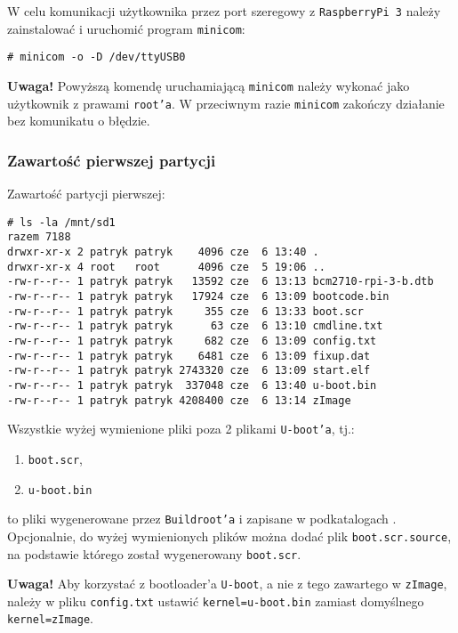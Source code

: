 \documentclass{article}
\begin{document}
W celu komunikacji użytkownika przez port szeregowy z \texttt{RaspberryPi~3} należy zainstalować i uruchomić program \texttt{minicom}:
\begin{verbatim}
# minicom -o -D /dev/ttyUSB0
\end{verbatim}
\textbf{Uwaga!} Powyższą komendę uruchamiającą \texttt{minicom} należy wykonać jako użytkownik z prawami \texttt{root'a}. W przeciwnym razie \texttt{minicom} zakończy działanie bez komunikatu o błędzie.


\subsubsection{Zawartość pierwszej partycji}

Zawartość partycji pierwszej:
\begin{lstlisting}[basicstyle=\ttfamily,breaklines=true]
# ls -la /mnt/sd1
razem 7188
drwxr-xr-x 2 patryk patryk    4096 cze  6 13:40 .
drwxr-xr-x 4 root   root      4096 cze  5 19:06 ..
-rw-r--r-- 1 patryk patryk   13592 cze  6 13:13 bcm2710-rpi-3-b.dtb
-rw-r--r-- 1 patryk patryk   17924 cze  6 13:09 bootcode.bin
-rw-r--r-- 1 patryk patryk     355 cze  6 13:33 boot.scr
-rw-r--r-- 1 patryk patryk      63 cze  6 13:10 cmdline.txt
-rw-r--r-- 1 patryk patryk     682 cze  6 13:09 config.txt
-rw-r--r-- 1 patryk patryk    6481 cze  6 13:09 fixup.dat
-rw-r--r-- 1 patryk patryk 2743320 cze  6 13:09 start.elf
-rw-r--r-- 1 patryk patryk  337048 cze  6 13:40 u-boot.bin
-rw-r--r-- 1 patryk patryk 4208400 cze  6 13:14 zImage
\end{lstlisting}
Wszystkie wyżej wymienione pliki poza 2 plikami \texttt{U-boot'a}, tj.:
\begin{enumerate}
	\item \texttt{boot.scr},
	\item \texttt{u-boot.bin}
\end{enumerate}
to pliki wygenerowane przez \texttt{Buildroot'a} i zapisane w podkatalogach . Opcjonalnie, do wyżej wymienionych plików można dodać plik \texttt{boot.scr.source}, na podstawie którego został wygenerowany \texttt{boot.scr}.

\textbf{Uwaga!} Aby korzystać z bootloader'a \texttt{U-boot}, a nie z tego zawartego w \texttt{zImage}, należy w pliku \texttt{config.txt} ustawić \texttt{kernel=u-boot.bin} zamiast domyślnego \texttt{kernel=zImage}.
\end{document}
